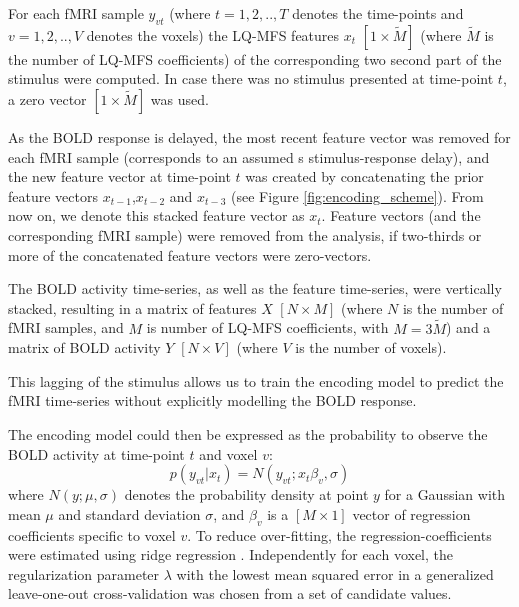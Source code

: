 For each f{MRI} sample $y_{vt}$ (where $t=1,2,..,T$ denotes the time-points and
$v=1,2,..,V$ denotes the voxels) the LQ-MFS features $x_{t}$
$[1\times\widetilde{M}]$ (where $\widetilde{M}$ is the number of LQ-MFS
coefficients) of the corresponding two second part of the stimulus were
computed. In case there was no stimulus presented at time-point $t$, a zero
vector $[1\times\widetilde{M}]$ was used. 

As the BOLD response is delayed,  the most recent feature vector was removed
for each f{MRI} sample (corresponds to an assumed \unit[2]{s} stimulus-response
delay), and the new feature vector at time-point $t$ was created by
concatenating the prior feature vectors $x_{t-1}$,$x_{t-2}$ and $x_{t-3}$ (see
Figure \ref{fig:encoding_scheme}). From now on, we denote this stacked feature
vector as $x_{t}$.  Feature vectors (and the corresponding f{MRI} sample) were
removed from the analysis, if two-thirds or more of the concatenated feature
vectors were zero-vectors.

The BOLD activity time-series, as well as the feature time-series, were
vertically stacked, resulting in a matrix of features $X$ $[N\times M]$ (where
$N$ is the number of f{MRI} samples, and $M$ is number of LQ-MFS coefficients,
with $M=3\widetilde{M}$) and a matrix of BOLD activity $Y$ $[N\times V]$ (where
$V$ is the number of voxels).

This lagging of the stimulus allows us to train the encoding model to predict
the f{MRI} time-series without explicitly modelling the BOLD response.

The encoding model could then be expressed as the probability to observe the
BOLD activity at time-point $t$ and voxel $v$:
%
\begin{equation}
  \label{eq:encmo}
  p(y_{vt}|x_{t}) = N(y_{vt};x_{t}\beta_{v},\sigma)
\end{equation}
%
where $N(y;\mu,\sigma)$ denotes the probability density at point $y$ for a
Gaussian with mean $\mu$ and standard deviation $\sigma$, and $\beta_{v}$ is a
$[M\times1]$ vector of regression coefficients specific to voxel $v$. To reduce
over-fitting, the regression-coefficients were estimated using ridge regression
\citep{HK70}.  Independently for each voxel, the regularization parameter
$\lambda$ with the lowest mean squared error in a generalized leave-one-out
cross-validation \citep{GHW79} was chosen from a set of candidate values.

